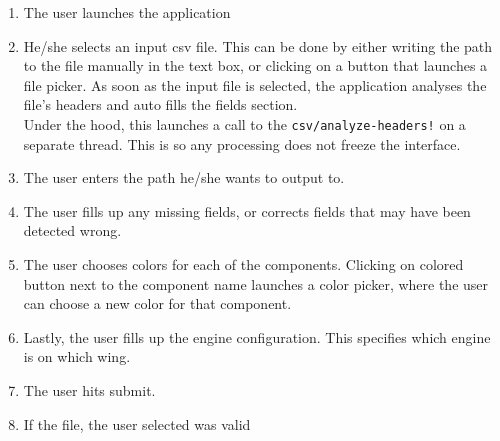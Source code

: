 \begin{enumerate}
\item The user launches the application
\item He/she selects an input csv file. This can be done by either writing the path to the file manually in the text box, or clicking on a button that launches a file picker. As soon as the input file is selected, the application analyses the file's headers and auto fills the fields section. \\
Under the hood, this launches a call to the \lstinline{csv/analyze-headers!} on a separate thread. This is so any processing does not freeze the interface.
\item The user enters the path he/she wants to output to.
\item The user fills up any missing fields, or corrects fields that may have been detected wrong.
\item The user chooses colors for each of the components. Clicking on colored button next to the component name launches a color picker, where the user can choose a new color for that component.
\item Lastly, the user fills up the engine configuration. This specifies which engine is on which wing.
\item The user hits submit.
\item If the file, the user selected was valid
\end{enumerate}
